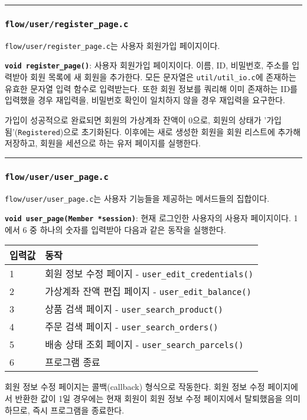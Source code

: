\documentclass[runningheads]{llncs}
\begin{document}
\noindent\rule{2cm}{0.4pt}

\subsubsection{\texttt{flow/user/register_page.c}}
\texttt{flow/user/register_page.c}는 사용자 회원가입 페이지이다.

\textbf{\texttt{void register_page()}}: 사용자 회원가입 페이지이다. 이름, ID, 비밀번호, 주소를 입력받아 회원 목록에 새 회원을 추가한다. 모든 문자열은 \texttt{util/util_io.c}에 존재하는 유효한 문자열 입력 함수로 입력받는다. 또한 회원 정보를 쿼리해 이미 존재하는 ID를 입력했을 경우 재입력을, 비밀번호 확인이 일치하지 않을 경우 재입력을 요구한다.

가입이 성공적으로 완료되면 회원의 가상계좌 잔액이 0으로, 회원의 상태가 '가입됨'(\texttt{Registered})으로 초기화된다. 이후에는 새로 생성한 회원을 회원 리스트에 추가해 저장하고, 회원을 세션으로 하는 유저 페이지를 실행한다.

\noindent\rule{2cm}{0.4pt}

\subsubsection{\texttt{flow/user/user_page.c}}
\texttt{flow/user/user_page.c}는 사용자 기능들을 제공하는 메서드들의 집합이다.

\textbf{\texttt{void user_page(Member *session)}}: 현재 로그인한 사용자의 사용자 페이지이다. 1에서 6 중 하나의 숫자를 입력받아 다음과 같은 동작을 실행한다.

\begin{tabularx}{\textwidth}{l|X}
	\hline
		입력값	& 동작 \\
	\hline
		1 & 회원 정보 수정 페이지 - \texttt{user_edit_credentials()} \\
		2 & 가상계좌 잔액 편집 페이지 - \texttt{user_edit_balance()} \\
		3 & 상품 검색 페이지 - \texttt{user_search_product()} \\
		4 & 주문 검색 페이지 - \texttt{user_search_orders()} \\
		5 & 배송 상태 조회 페이지 - \texttt{user_search_parcels()} \\
		6 & 프로그램 종료 \\
	\hline
\end{tabularx}

회원 정보 수정 페이지는 콜백(callback) 형식으로 작동한다. 회원 정보 수정 페이지에서 반환한 값이 1일 경우에는 현재 회원이 회원 정보 수정 페이지에서 탈퇴했음을 의미하므로, 즉시 프로그램을 종료한다.
\end{document}

